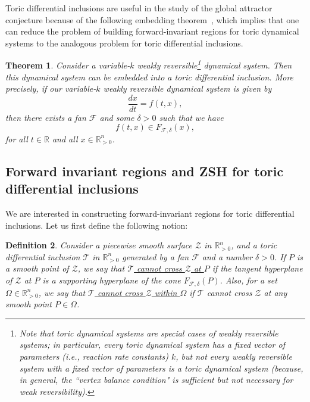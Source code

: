 \documentclass[12pt,letterpaper]{article}
\newtheorem{thm}{Theorem}[section]
\newtheorem{defn}[thm]{Definition}
\newcommand{\T}{\mathcal{T}}
\newcommand{\F}{\mathcal{F}}
\newcommand{\Z}{\mathcal{Z}}
\newcommand{\RR}{\mathbb{R}}
\newcommand{\RRp}{\mathbb{R}_{>0}}
\newcommand{\RRpn}{\mathbb{R}_{>0}^n}
\begin{document}
\bigskip

Toric  differential inclusions are useful in the study of the global attractor conjecture because of the following embedding theorem~\cite{Craciun_SIAGA_2019}, which implies that one can reduce the problem of building forward-invariant regions for toric dynamical systems to the analogous problem for toric differential inclusions.


\begin{thm} Consider a variable-$k$  weakly reversible\footnote{Note that toric dynamical systems are special cases of weakly reversible systems; in particular, every toric dynamical system has a {\em fixed} vector of parameters (i.e., reaction rate constants) $k$, but {\em not every} weakly reversible system with a fixed vector of parameters is a toric dynamical system (because, in general, the ``vertex balance condition" is sufficient but not necessary for weak reversibility).} dynamical system. Then this dynamical system can be embedded into a toric differential inclusion. More precisely, if our variable-$k$  weakly reversible dynamical system is given by 
$$
\frac{dx}{dt} = f(t,x),
$$
then there exists a fan $\mathcal{F}$ 
and some $\delta > 0$ such that we have  
$$
f(t,x) \in {F}_{\mathcal{F}, \delta}(x),
$$
for all $t \in \RR$ and all $x \in \RRpn$.
\end{thm} 


\subsection{Forward invariant regions and ZSH for toric differential inclusions}

We are interested in constructing forward-invariant regions for toric differential inclusions. Let us first define the following notion:

\begin{defn}
Consider a piecewise smooth surface $\Z$ in $\RRp^n$, and a toric differential inclusion $\T$ in $\RRp^n$ generated by a fan $\F$ and a number $\delta>0$. If $P$ is a smooth point of $\Z$, we say that \underline{$\T$ cannot cross $\Z$ at $P$} if the tangent hyperplane of $\Z$ at $P$ is a  supporting hyperplane of the cone $F_{\F, \delta}(P)$. Also, for a set $\Omega \in \RRp^n$, we say that \underline{$\T$ cannot cross $\Z$ within $\Omega$} if $\T$ cannot cross $\Z$ at any smooth point $P \in \Omega$.
\end{defn}
\end{document}
